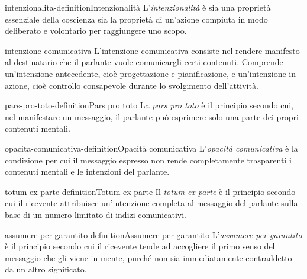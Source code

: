 \documentclass[preview]{standalone}
\begin{document}
\begin{snippetdefinition}{intenzionalita-definition}{Intenzionalità}
    L'\emph{intenzionalità} è sia una proprietà essenziale della coscienza sia
    la proprietà di un'azione compiuta in modo deliberato e volontario per
    raggiungere uno scopo.
\end{snippetdefinition}

\begin{snippet}{intenzione-comunicativa}
    L'intenzione comunicativa consiste nel rendere manifesto al destinatario che
    il parlante vuole comunicargli certi contenuti. Comprende un'intenzione
    antecedente, cioè progettazione e pianificazione, e un'intenzione in azione,
    cioè controllo consapevole durante lo svolgimento dell'attività.
\end{snippet}

\begin{snippetdefinition}{pars-pro-toto-definition}{Pars pro toto}
    La \emph{pars pro toto} è il principio secondo cui, nel manifestare un
    messaggio, il parlante può esprimere solo una parte dei propri contenuti
    mentali.
\end{snippetdefinition}

\begin{snippetdefinition}{opacita-comunicativa-definition}{Opacità comunicativa}
    L'\emph{opacità comunicativa} è la condizione per cui il messaggio espresso
    non rende completamente trasparenti i contenuti mentali e le intenzioni del
    parlante.
\end{snippetdefinition}

\begin{snippetdefinition}{totum-ex-parte-definition}{Totum ex parte}
    Il \emph{totum ex parte} è il principio secondo cui il ricevente attribuisce
    un'intenzione completa al messaggio del parlante sulla base di un numero
    limitato di indizi comunicativi.
\end{snippetdefinition}

\begin{snippetdefinition}{assumere-per-garantito-definition}{Assumere per garantito}
    L'\emph{assumere per garantito} è il principio secondo cui il ricevente tende
    ad accogliere il primo senso del messaggio che gli viene in mente, purché
    non sia immediatamente contraddetto da un altro significato.
\end{snippetdefinition}
\end{document}
